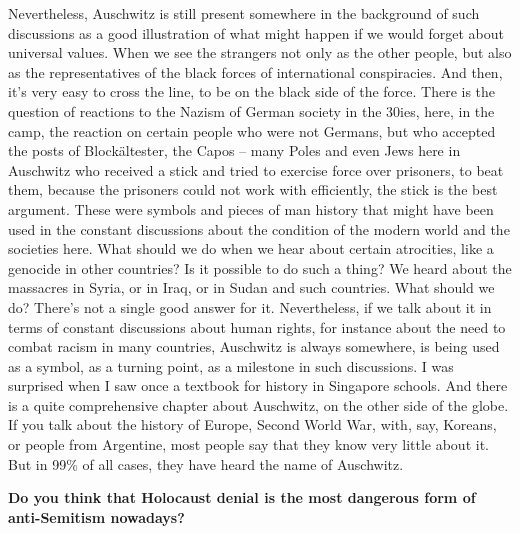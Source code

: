 Nevertheless, Auschwitz is still present somewhere in the background of such discussions as a good illustration of what might happen if we would forget about universal values. When we see the strangers not only as the other people, but also as the representatives of the black forces of international conspiracies. And then, it’s very easy to cross the line, to be on the black side of the force. There is the question of reactions to the Nazism of German society in the 30ies, here, in the camp, the reaction on certain people who were not Germans, but who accepted the posts of Blockältester, the Capos – many Poles and even Jews here in Auschwitz who received a stick and tried to exercise force over prisoners, to beat them, because the prisoners could not work with efficiently, the stick is the best argument. These were symbols and pieces of man history that might have been used in the constant discussions about the condition of the modern world and the societies here. What should we do when we hear about certain atrocities, like a genocide in other countries? Is it possible to do such a thing? We heard about the massacres in Syria, or in Iraq, or in Sudan and such countries. What should we do? There’s not a single good answer for it. Nevertheless, if we talk about it in terms of constant discussions about human rights, for instance about the need to combat racism in many countries, Auschwitz is always somewhere, is being used as a symbol, as a turning point, as a milestone in such discussions. I was surprised when I saw once a textbook for history in Singapore schools. And there is a quite comprehensive chapter about Auschwitz, on the other side of the globe. If you talk about the history of Europe, Second World War, with, say, Koreans, or people from Argentine, most people say that they know very little about it. But in 99\% of all cases, they have heard the name of Auschwitz.
 
\textbf{Do you think that Holocaust denial is the most dangerous form of anti-Semitism nowadays?}

